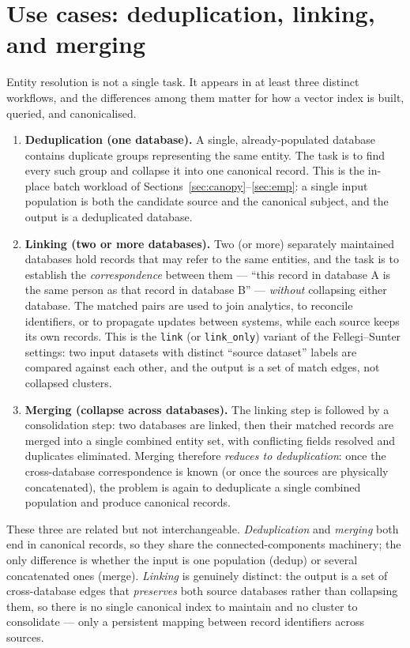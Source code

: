 \documentclass[11pt]{article}
\begin{document}
\section{Use cases: deduplication, linking, and merging}
\label{sec:use-cases}
Entity resolution is not a single task. It appears in at least three distinct workflows, and
the differences among them matter for how a vector index is built, queried, and canonicalised.

\begin{enumerate}
  \item \textbf{Deduplication (one database).} A single, already-populated database contains
        duplicate groups representing the same entity. The task is to find every such group
        and collapse it into one canonical record. This is the in-place batch workload of
        Sections~\ref{sec:canopy}--\ref{sec:emp}: a single input population is both the
        candidate source and the canonical subject, and the output is a deduplicated database.
  \item \textbf{Linking (two or more databases).} Two (or more) separately maintained
        databases hold records that may refer to the same entities, and the task is to
        establish the \emph{correspondence} between them --- ``this record in database A is
        the same person as that record in database B'' --- \emph{without} collapsing either
        database. The matched pairs are used to join analytics, to reconcile identifiers, or
        to propagate updates between systems, while each source keeps its own records. This
        is the \texttt{link} (or \texttt{link\_only}) variant of the Fellegi--Sunter settings:
        two input datasets with distinct ``source dataset'' labels are compared against each
        other, and the output is a set of match edges, not collapsed clusters.
  \item \textbf{Merging (collapse across databases).} The linking step is followed by a
        consolidation step: two databases are linked, then their matched records are merged
        into a single combined entity set, with conflicting fields resolved and duplicates
        eliminated. Merging therefore \emph{reduces to deduplication}: once the cross-database
        correspondence is known (or once the sources are physically concatenated), the problem
        is again to deduplicate a single combined population and produce canonical records.
\end{enumerate}

These three are related but not interchangeable. \emph{Deduplication} and \emph{merging} both
end in canonical records, so they share the connected-components machinery; the only
difference is whether the input is one population (dedup) or several concatenated ones
(merge). \emph{Linking} is genuinely distinct: the output is a set of cross-database edges
that \emph{preserves} both source databases rather than collapsing them, so there is no single
canonical index to maintain and no cluster to consolidate --- only a persistent mapping between
record identifiers across sources.
\end{document}
